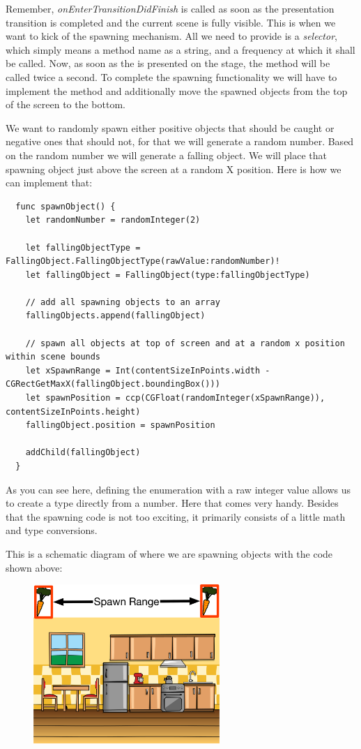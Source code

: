 Remember, \textit{onEnterTransitionDidFinish} is called as soon as the
presentation transition is completed and the current scene is fully visible.
This is when we want to kick of the spawning mechanism. 
All we need to provide is a \textit{selector}, which simply means a method name
as a string, and a frequency at which it shall be called. Now, as soon as the
 is presented on the stage, the 
method will be called twice a second.
To complete the spawning functionality we will have to implement the
 method and additionally move the spawned objects from
the top of the screen to the bottom.

We want to randomly spawn either positive objects that should be caught or
negative ones that should not, for that we will generate a random number. Based
on the random number we will generate a falling object. We will place that
spawning object just above the screen at a random X position. Here is how we can
implement that:

\begin{lstlisting}
  func spawnObject() {
    let randomNumber = randomInteger(2)
    
    let fallingObjectType = FallingObject.FallingObjectType(rawValue:randomNumber)!
    let fallingObject = FallingObject(type:fallingObjectType)
    
    // add all spawning objects to an array
    fallingObjects.append(fallingObject)
    
    // spawn all objects at top of screen and at a random x position within scene bounds
    let xSpawnRange = Int(contentSizeInPoints.width - CGRectGetMaxX(fallingObject.boundingBox()))
    let spawnPosition = ccp(CGFloat(randomInteger(xSpawnRange)), contentSizeInPoints.height)
    fallingObject.position = spawnPosition
    
    addChild(fallingObject)
  }
\end{lstlisting}

As you can see here, defining the  enumeration
with a raw integer value allows us to create a type directly from a number.
Here that comes very handy. Besides that the spawning code is not too exciting,
it primarily consists of a little math and type conversions.

This is a schematic diagram of where we are spawning
objects with the code shown above:

\begin{figure}[H]
		\centering
		\includegraphics[width=200pt]{images/Chapter2/SpawnObjects.png}
\end{figure}

